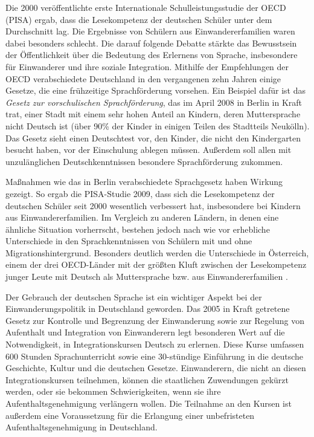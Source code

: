 \documentclass[]{../../metanetpaper}
\begin{document}
\begin{multicols}{2}
Die 2000 veröffentlichte erste Internationale Schulleistungsstudie der OECD (PISA) ergab, dass die Lesekompetenz der deutschen Schüler unter dem Durchschnitt lag. Die Ergebnisse von Schülern aus Einwandererfamilien waren dabei besonders schlecht. Die darauf folgende Debatte stärkte das Bewusstsein der Öffentlichkeit über die Bedeutung des Erlernens von Sprache, insbesondere für Einwanderer und ihre soziale Integration. Mithilfe der Empfehlungen der OECD verabschiedete Deutschland in den vergangenen zehn Jahren einige Gesetze, die eine frühzeitige Sprachförderung vorsehen. Ein Beispiel dafür ist das \textit{Gesetz zur vorschulischen Sprachförderung}, das im April 2008 in Berlin in Kraft trat, einer Stadt mit einem sehr hohen Anteil an Kindern, deren Muttersprache nicht Deutsch ist (über 90\% der Kinder in einigen Teilen des Stadtteils Neukölln). Das Gesetz sieht einen Deutschtest vor, den Kinder, die nicht den Kindergarten besucht haben, vor der Einschulung ablegen müssen. Außerdem soll allen mit unzulänglichen Deutschkenntnissen besondere Sprachförderung zukommen.

Maßnahmen wie das in Berlin verabschiedete Sprachgesetz haben Wirkung gezeigt. So ergab die PISA-Studie 2009, dass sich die Lesekompetenz der deutschen Schüler seit 2000 wesentlich verbessert hat, insbesondere bei Kindern aus Einwandererfamilien. Im Vergleich zu anderen Ländern, in denen eine ähnliche Situation vorherrscht, bestehen jedoch nach wie vor erhebliche Unterschiede in den Sprachkenntnissen von Schülern mit und ohne Migrationshintergrund. Besonders deutlich werden die Unterschiede in Österreich, einem der drei OECD-Länder mit der größten Kluft zwischen der Lesekompetenz junger Leute mit Deutsch als Muttersprache bzw. aus Einwandererfamilien \cite{Pisa1}.

Der Gebrauch der deutschen Sprache ist ein wichtiger Aspekt bei der Einwanderungspolitik in Deutschland geworden. Das 2005 in Kraft getretene Gesetz zur Kontrolle und Begrenzung der Einwanderung sowie zur Regelung von Aufenthalt und Integration von Einwanderern legt besonderen Wert auf die Notwendigkeit, in Integrationskursen Deutsch zu erlernen. Diese Kurse umfassen 600 Stunden Sprachunterricht sowie eine 30-stündige Einführung in die deutsche Geschichte, Kultur und die deutschen Gesetze. Einwanderern, die nicht an diesen Integrationskursen teilnehmen, können die staatlichen Zuwendungen gekürzt werden, oder sie bekommen Schwierigkeiten, wenn sie ihre Aufenthaltsgenehmigung verlängern wollen. Die Teilnahme an den Kursen ist außerdem eine Voraussetzung für die Erlangung einer unbefristeten Aufenthaltsgenehmigung in Deutschland.


\end{multicols}
\end{document}
